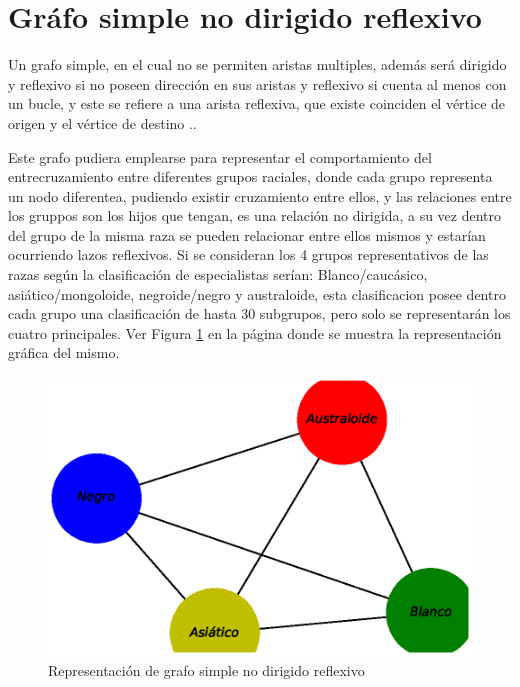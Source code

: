 \documentclass{article}
\begin{document}
\section{Gráfo simple no dirigido reflexivo}

Un grafo simple, en el cual  no se permiten aristas multiples, además será dirigido y reflexivo si no poseen dirección en sus aristas y reflexivo si cuenta al menos con un bucle, y este se refiere a una arista reflexiva, que existe coinciden el vértice de origen y el vértice de destino .\cite{Elisa}. 

Este grafo pudiera emplearse para representar el comportamiento del entrecruzamiento entre diferentes grupos raciales, donde cada grupo representa un nodo diferentea, pudiendo existir cruzamiento entre ellos, y las relaciones entre los gruppos son los hijos que tengan, es una relación no dirigida, a su vez dentro del grupo de la misma raza se pueden relacionar entre ellos mismos y estarían ocurriendo lazos reflexivos. Si se consideran los 4 grupos representativos de las razas según la clasificación de especialistas serían: Blanco/caucásico, asiático/mongoloide, negroide/negro y australoide, esta clasificacion posee dentro cada grupo una clasificación de hasta 30 subgrupos, pero solo se representarán los cuatro principales. Ver Figura \ref{fig:Fig03} en la página \pageref{fig:Fig03} donde se muestra la representación gráfica del mismo. 



\begin{figure}
    \centering
    \includegraphics[scale=0.4]{imagenes/Fig03.eps}
    \caption{Representación de grafo simple no dirigido reflexivo}
    \label{fig:Fig03}
\end{figure}
\end{document}
